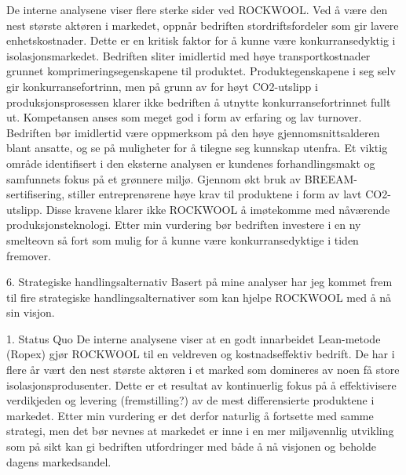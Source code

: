 De interne analysene viser flere sterke sider ved ROCKWOOL. Ved å være den nest største aktøren i markedet, oppnår bedriften stordriftsfordeler som gir lavere enhetskostnader. Dette er en kritisk faktor for å kunne være konkurransedyktig i isolasjonsmarkedet. Bedriften sliter imidlertid med høye transportkostnader grunnet komprimeringsegenskapene til produktet. Produktegenskapene i seg selv gir konkurransefortrinn, men på grunn av for høyt CO2-utslipp i produksjonsprosessen klarer ikke bedriften å utnytte konkurransefortrinnet fullt ut. Kompetansen anses som meget god i form av erfaring og lav turnover. Bedriften bør imidlertid være oppmerksom på den høye gjennomsnittsalderen blant ansatte, og se på muligheter for å tilegne seg kunnskap utenfra. 
Et viktig område identifisert i den eksterne analysen er kundenes forhandlingsmakt og samfunnets fokus på et grønnere miljø. Gjennom økt bruk av BREEAM-sertifisering, stiller entreprenørene høye krav til produktene i form av lavt CO2-utslipp. Disse kravene klarer ikke ROCKWOOL å imøtekomme med nåværende produksjonsteknologi. Etter min vurdering bør bedriften investere i en ny smelteovn så fort som mulig for å kunne være konkurransedyktige i tiden fremover.

6. Strategiske handlingsalternativ
Basert på mine analyser har jeg kommet frem til fire strategiske handlingsalternativer som kan hjelpe ROCKWOOL med å nå sin visjon.

1. Status Quo
De interne analysene viser at en godt innarbeidet Lean-metode (Ropex) gjør ROCKWOOL til en veldreven og kostnadseffektiv bedrift. De har i flere år vært den nest største aktøren i et marked som domineres av noen få store isolasjonsprodusenter. Dette er et resultat av kontinuerlig fokus på å effektivisere verdikjeden og levering (fremstilling?) av de mest differensierte produktene i markedet. Etter min vurdering er det derfor naturlig å fortsette med samme strategi, men det bør nevnes at markedet er inne i en mer miljøvennlig utvikling som på sikt kan gi bedriften utfordringer med både å nå visjonen og beholde dagens markedsandel.
    
